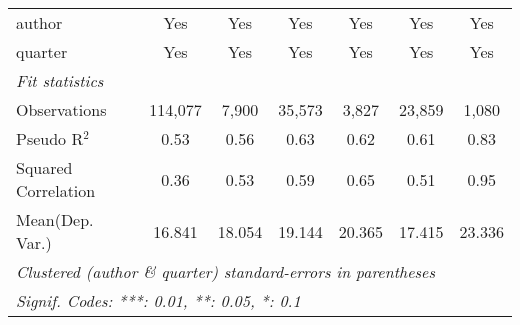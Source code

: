 \begin{tabular}{lcccccc}
   author                                                     & Yes           & Yes          & Yes           & Yes           & Yes           & Yes\\  
   quarter                                                    & Yes           & Yes          & Yes           & Yes           & Yes           & Yes\\  
   \midrule
   \emph{Fit statistics}\\
   Observations                                               & 114,077       & 7,900        & 35,573        & 3,827         & 23,859        & 1,080\\  
   Pseudo R$^2$                                               & 0.53          & 0.56         & 0.63          & 0.62          & 0.61          & 0.83\\  
   Squared Correlation                                        & 0.36          & 0.53         & 0.59          & 0.65          & 0.51          & 0.95\\  
Mean(Dep. Var.) & 16.841 & 18.054 & 19.144 & 20.365 & 17.415 & 23.336 \\
   \midrule \midrule
   \multicolumn{7}{l}{\emph{Clustered (author \& quarter) standard-errors in parentheses}}\\
   \multicolumn{7}{l}{\emph{Signif. Codes: ***: 0.01, **: 0.05, *: 0.1}}\\
\end{tabular}
\par\endgroup
